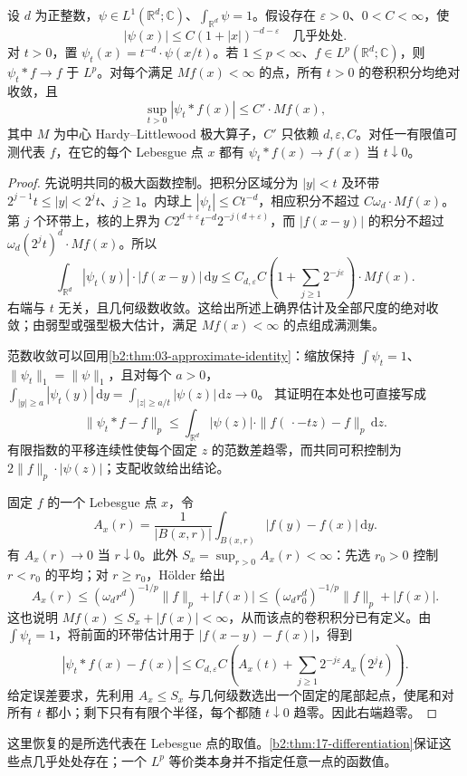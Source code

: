 \begin{proposition}\label{b2:prop:17-approximate-identity}
设 \(d\) 为正整数，\(\psi\in L^1(\mathbb R^d;\mathbb C)\)、\(\int_{\mathbb R^d}\psi=1\)。假设存在 \(\varepsilon>0\)、\(0<C<\infty\)，使
\[
 |\psi(x)|\leq C(1+|x|)^{-d-\varepsilon}
 \quad\text{几乎处处}.
\]
对 \(t>0\)，置 \(\psi_t(x)=t^{-d}\cdot\psi(x/t)\)。若 \(1\leq p<\infty\)、\(f\in L^p(\mathbb R^d;\mathbb C)\)，则 \(\psi_t*f\to f\) 于 \(L^p\)。对每个满足 \(Mf(x)<\infty\) 的点，所有 \(t>0\) 的卷积积分均绝对收敛，且
\[
 \sup_{t>0}|\psi_t*f(x)|\leq C'\cdot Mf(x),
\]
其中 \(M\) 为中心 Hardy--Littlewood 极大算子，\(C'\) 只依赖 \(d,\varepsilon,C\)。对任一有限值可测代表 \(f\)，在它的每个 Lebesgue 点 \(x\) 都有 \(\psi_t*f(x)\to f(x)\) 当 \(t\downarrow0\)。
\end{proposition}
\begin{proof}
先说明共同的极大函数控制。把积分区域分为 \(|y|<t\) 及环带 \(2^{j-1}t\leq|y|<2^jt\)、\(j\geq1\)。内球上 \(|\psi_t|\leq Ct^{-d}\)，相应积分不超过 \(C\omega_d\cdot Mf(x)\)。第 \(j\) 个环带上，核的上界为
\(C2^{d+\varepsilon}t^{-d}2^{-j(d+\varepsilon)}\)，而 \(|f(x-y)|\) 的积分不超过
\(\omega_d(2^jt)^d\cdot Mf(x)\)。所以
\[
 \int_{\mathbb R^d}|\psi_t(y)|\cdot|f(x-y)|\,\mathrm dy
 \leq C_{d,\varepsilon}C
       \left(1+\sum_{j\geq1}2^{-j\varepsilon}\right)\cdot Mf(x).
\]
右端与 \(t\) 无关，且几何级数收敛。这给出所述上确界估计及全部尺度的绝对收敛；由弱型或强型极大估计，满足 \(Mf(x)<\infty\) 的点组成满测集。

范数收敛可以回用\cref{b2:thm:03-approximate-identity}：缩放保持 \(\int\psi_t=1\)、\(\|\psi_t\|_1=\|\psi\|_1\)，且对每个 \(a>0\)，
\(\int_{|y|\geq a}|\psi_t(y)|\,\mathrm dy
=\int_{|z|\geq a/t}|\psi(z)|\,\mathrm dz\to0\)。
其证明在本处也可直接写成
\[
 \|\psi_t*f-f\|_p
 \leq\int_{\mathbb R^d}|\psi(z)|\cdot
             \|f(\,\cdot-tz)-f\|_p\,\mathrm dz.
\]
有限指数的平移连续性使每个固定 \(z\) 的范数差趋零，而共同可积控制为
\(2\|f\|_p\cdot|\psi(z)|\)；支配收敛给出结论。

固定 \(f\) 的一个 Lebesgue 点 \(x\)，令
\[
 A_x(r)=\frac1{|B(x,r)|}\int_{B(x,r)}|f(y)-f(x)|\,\mathrm dy.
\]
有 \(A_x(r)\to0\) 当 \(r\downarrow0\)。此外 \(S_x=\sup_{r>0}A_x(r)<\infty\)：先选 \(r_0>0\) 控制 \(r<r_0\) 的平均；对 \(r\geq r_0\)，Hölder 给出
\[
 A_x(r)\leq (\omega_dr^d)^{-1/p}\|f\|_p+|f(x)|
 \leq(\omega_dr_0^d)^{-1/p}\|f\|_p+|f(x)|.
\]
这也说明 \(Mf(x)\leq S_x+|f(x)|<\infty\)，从而该点的卷积积分已有定义。由 \(\int\psi_t=1\)，将前面的环带估计用于 \(|f(x-y)-f(x)|\)，得到
\[
 |\psi_t*f(x)-f(x)|
 \leq C_{d,\varepsilon}C
       \left(A_x(t)+\sum_{j\geq1}2^{-j\varepsilon}A_x(2^jt)\right).
\]
给定误差要求，先利用 \(A_x\leq S_x\) 与几何级数选出一个固定的尾部起点，使尾和对所有 \(t\) 都小；剩下只有有限个半径，每个都随 \(t\downarrow0\) 趋零。因此右端趋零。
\end{proof}

这里恢复的是所选代表在 Lebesgue 点的取值。\cref{b2:thm:17-differentiation}保证这些点几乎处处存在；一个 \(L^p\) 等价类本身并不指定任意一点的函数值。
